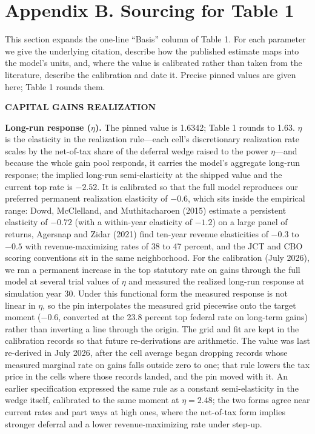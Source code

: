 \documentclass[10pt,twocolumn]{article}
\begin{document}
\section*{Appendix B. Sourcing for Table 1}

This section expands the one-line ``Basis'' column of Table 1. For each
parameter we give the underlying citation, describe how the published estimate
maps into the model's units, and, where the value is calibrated rather than
taken from the literature, describe the calibration and date it. Precise
pinned values are given here; Table 1 rounds them.

\medskip\noindent\textbf{\small CAPITAL GAINS REALIZATION}

\textbf{Long-run response ($\eta$).} The pinned value is 1.6342; Table 1
rounds to 1.63. $\eta$ is the elasticity in the realization rule---each
cell's discretionary realization rate scales by the net-of-tax share of the
deferral wedge raised to the power $\eta$---and because the whole gain pool
responds, it carries the model's aggregate long-run response; the implied
long-run semi-elasticity at the shipped value and the current top rate is
$-2.52$. It is calibrated so that the full model reproduces
our preferred permanent realization elasticity of $-0.6$, which sits inside
the empirical range: Dowd, McClelland, and Muthitacharoen (2015) estimate a
persistent elasticity of $-0.72$ (with a within-year elasticity of $-1.2$) on
a large panel of returns, Agersnap and Zidar (2021) find ten-year revenue
elasticities of $-0.3$ to $-0.5$ with revenue-maximizing rates of 38 to 47
percent, and the JCT and CBO scoring conventions sit in the same neighborhood.
For the calibration (July 2026), we ran a permanent increase in the top
statutory rate on gains through the full model at several trial values of
$\eta$ and measured the realized long-run response at simulation year 30.
Under this functional form the measured response is not linear in $\eta$, so
the pin interpolates the measured grid piecewise onto the target moment
($-0.6$, converted at the 23.8 percent top federal rate on long-term gains)
rather than inverting a line through the origin. The grid and fit are kept in
the calibration records so that future re-derivations are arithmetic. The
value was last re-derived in July 2026, after the cell average began dropping
records whose measured marginal rate on gains falls outside zero to one; that
rule lowers the tax price in the cells where those records landed, and the pin
moved with it. An
earlier specification expressed the same rule as a constant semi-elasticity in
the wedge itself, calibrated to the same moment at $\eta = 2.48$; the two
forms agree near current rates and part ways at high ones, where the
net-of-tax form implies stronger deferral and a lower revenue-maximizing rate
under step-up.
\end{document}
